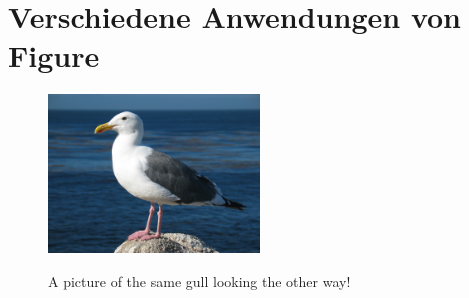 \documentclass[10pt, a4paper]{article}
\begin{document}
\section{Verschiedene Anwendungen von Figure}


\begin{figure}[h]
\centering
  \includegraphics[width=0.5\textwidth]{gull_picture}
\end{figure}

\begin{figure}[h]
  \centering
  \caption{A picture of the same gull
           looking the other way!}
\end{figure}
\newpage
\end{document}
